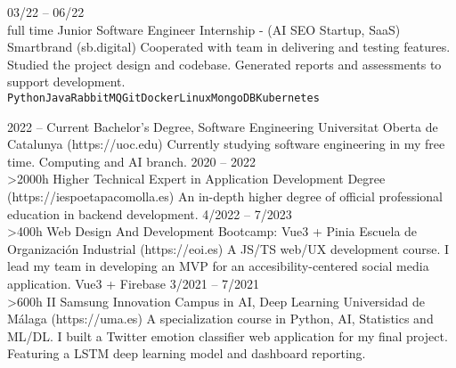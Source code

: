 \documentclass[10pt]{developercv} %
\begin{document}
\begin{entrylist}
	\entry
		{03/22 -- 06/22\\\footnotesize{full time}}
		{Junior Software Engineer Internship - (AI SEO Startup, SaaS)}
		{Smartbrand (sb.digital)}
		{Cooperated with team in delivering and testing features. Studied the project design and codebase. Generated reports and assessments to support development. \\ 
		\texttt{Python}\slashsep\texttt{Java}\slashsep\texttt{RabbitMQ}\slashsep\texttt{Git}\slashsep\texttt{Docker}\slashsep\texttt{Linux}\slashsep\texttt{MongoDB}\slashsep\texttt{Kubernetes}}
\end{entrylist}



\begin{entrylist}
	\entry
		{2022 -- Current}
		{Bachelor's Degree, Software Engineering}
		{Universitat Oberta de Catalunya (https://uoc.edu)}
		{Currently studying software engineering in my free time. Computing and AI branch.}
	\entry
		{2020 -- 2022\\\footnotesize{>2000h}}
		{Higher Technical Expert in Application Development Degree}
		{(https://iespoetapacomolla.es)}
		{An in-depth higher degree of official professional education in backend development.}
	\entry
	{4/2022 -- 7/2023\\\footnotesize{>400h}}
	{Web Design And Development Bootcamp: Vue3 + Pinia}
	{Escuela de Organización Industrial (https://eoi.es)}
	{A JS/TS web/UX development course. I lead my team in developing an MVP for an accesibility-centered social media application. Vue3 + Firebase}
	\entry
		{3/2021 -- 7/2021\\\footnotesize{>600h}}
		{II Samsung Innovation Campus in AI, Deep Learning}
		{Universidad de Málaga (https://uma.es)}
		{A specialization course in Python, AI, Statistics and ML/DL. I built a Twitter emotion classifier web application for my final project. Featuring a LSTM deep learning model and dashboard reporting.}
\end{entrylist}


\end{document}
